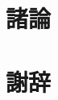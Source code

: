 \documentclass[12pt]{jreport}
\begin{document}
\maketitle
\tableofcontents
\chapter{諸論}
\chapter*{謝辞}
\end{document}
